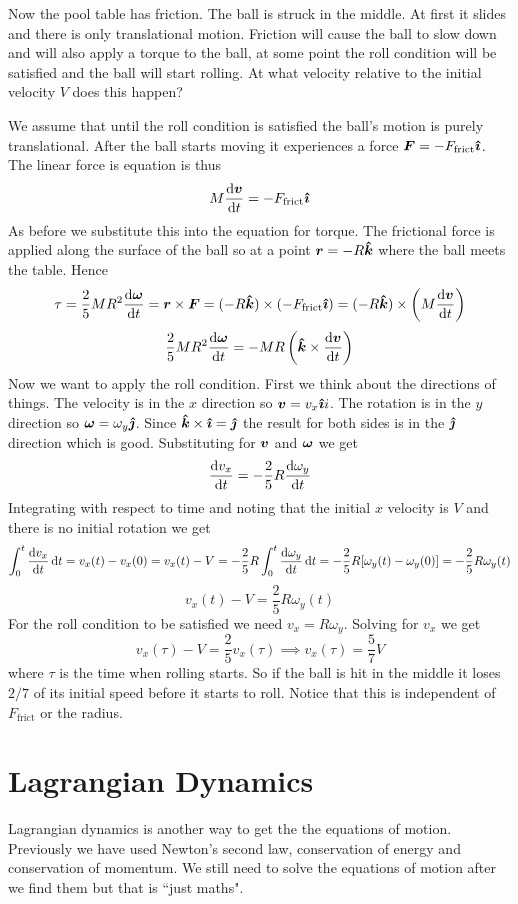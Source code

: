 \documentclass{article}
\newcommand{\vk}{\vh k}
\begin{document}
    \example
    Now the pool table has friction.
    The ball is struck in the middle.
    At first it slides and there is only translational motion.
    Friction will cause the ball to slow down and will also apply a torque to the ball, at some point the roll condition will be satisfied and the ball will start rolling.
    At what velocity relative to the initial velocity \(V\) does this happen?
    
    We assume that until the roll condition is satisfied the ball's motion is purely translational.
    After the ball starts moving it experiences a force \(\bm{F} = -F_\text{frict}\bm{\hat{\imath}}\).
    The linear force is equation is thus
    \[M\dv{\bm{v}}{t} = -F_\text{frict}\bm{\hat{\imath}}\]
    As before we substitute this into the equation for torque.
    The frictional force is applied along the surface of the ball so at a point \(\vv r = -R\vk\) where the ball meets the table.
    Hence
    \[\tau = \frac{2}{5}MR^2\dv{\vv\omega}{t} = \vv r\times\vv F = (-R\vk)\times(-F_\text{frict}\vi) = (-R\vk)\times \left(M\dv{\vv v}{t}\right)\]
    \[\frac{2}{5}MR^2\dv{\vv\omega}{t} = -MR\left(\vk\times\dv{\vv v}{t}\right)\]
    Now we want to apply the roll condition.
    First we think about the directions of things.
    The velocity is in the \(x\) direction so \(\bm{v} = v_x\bm{\hat{\imath}} i\).
    The rotation is in the \(y\) direction so \(\bm{\omega} = \omega_y\bm{\hat{\jmath}}\). 
    Since \(\vk\times\vi = \vj\) the result for both sides is in the \(\bm{\hat{\jmath}}\) direction which is good.
    Substituting for \(\bm{v}\) and \(\bm{\omega}\) we get
    \[\dv{v_x}{t} = -\frac{2}{5}R\dv{\omega_y}{t}\]
    Integrating with respect to time and noting that the initial \(x\) velocity is \(V\) and there is no initial rotation we get
    \[\int_0^t\dv{v_x}{t}\,\dd t = v_x(t) - v_x(0) = v_x(t) - V = -\frac{2}{5}R\int_0^t \dv{\omega_y}{t}\,\dd t = -\frac{2}{5}R[\omega_y(t) - \omega_y(0)] = -\frac{2}{5}R\omega_y(t)\]
    \[v_x(t) - V = \frac{2}{5}R\omega_y(t)\]
    For the roll condition to be satisfied we need \(v_x = R\omega_y\).
    Solving for \(v_x\) we get
    \[v_x(\tau) - V = \frac{2}{5}v_x(\tau)\implies v_x(\tau) = \frac{5}{7}V\]
    where \(\tau\) is the time when rolling starts.
    So if the ball is hit in the middle it loses \(2/7\) of its initial speed before it starts to roll.
    Notice that this is independent of \(F_\text{frict}\) or the radius.
    
    \section{Lagrangian Dynamics}
    Lagrangian dynamics is another way to get the the equations of motion.
    Previously we have used Newton's second law, conservation of energy and conservation of momentum.
    We still need to solve the equations of motion after we find them but that is ``just maths".
    
\end{document}
